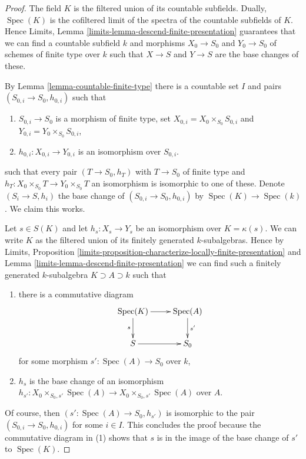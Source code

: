 \documentclass{stacks-project}
\theoremstyle{plain}
\theoremstyle{definition}
\theoremstyle{remark}
\numberwithin{equation}{subsection}
\def\Spec{\mathop{\mathrm{Spec}}}
\begin{document}
\begin{proof}
The field $K$ is the filtered union of its countable subfields.
Dually, $\Spec(K)$ is the cofiltered limit of the spectra
of the countable subfields of $K$.
Hence Limits, Lemma \ref{limits-lemma-descend-finite-presentation}
guarantees that we can find a countable subfield
$k$ and morphisms $X_0 \to S_0$ and $Y_0 \to S_0$
of schemes of finite type over $k$ such that
$X \to S$ and $Y \to S$ are the base changes of these.

\medskip\noindent
By Lemma \ref{lemma-countable-finite-type} there is a countable set $I$ and
pairs $(S_{0, i} \to S_0, h_{0, i})$ such that
\begin{enumerate}
\item $S_{0, i} \to S_0$ is a morphism of finite type, set
$X_{0, i} = X_0 \times_{S_0} S_{0, i}$ and
$Y_{0, i} = Y_0 \times_{S_0} S_{0, i}$,
\item $h_{0, i} : X_{0, i} \to Y_{0, i}$ is an isomorphism over $S_{0, i}$.
\end{enumerate}
such that every pair $(T \to S_0, h_T)$ with $T \to S_0$ of finite type
and $h_T : X_0 \times_{S_0} T \to Y_0 \times_{S_0} T$ an isomorphism
is isomorphic to one of these.
Denote $(S_i \to S, h_i)$ the base change of $(S_{0, i} \to S_0, h_{0, i})$
by $\Spec(K) \to \Spec(k)$.
We claim this works.

\medskip\noindent
Let $s \in S(K)$ and let $h_s : X_s \to Y_s$ be an isomorphism over
$K = \kappa(s)$. We can write $K$ as the filtered union of its
finitely generated $k$-subalgebras. Hence by
Limits, Proposition
\ref{limits-proposition-characterize-locally-finite-presentation} and
Lemma \ref{limits-lemma-descend-finite-presentation}
we can find such a finitely generated $k$-subalgebra
$K \supset A \supset k$ such that
\begin{enumerate}
\item there is a commutative diagram
$$
\xymatrix{
\Spec(K) \ar[d]_s \ar[r] &
\Spec(A) \ar[d]^{s'} \\
S \ar[r] &
S_0}
$$
for some morphism $s' : \Spec(A) \to S_0$ over $k$,
\item $h_s$ is the base change of an isomorphism
$h_{s'} : X_0 \times_{S_0, s'} \Spec(A) \to
X_0 \times_{S_0, s'} \Spec(A)$ over $A$.
\end{enumerate}
Of course, then $(s' : \Spec(A) \to S_0, h_{s'})$ is isomorphic
to the pair $(S_{0, i} \to S_0, h_{0, i})$ for some $i \in I$.
This concludes the proof because the commutative diagram
in (1) shows that $s$ is in the image of
the base change of $s'$ to $\Spec(K)$.
\end{proof}
\end{document}
